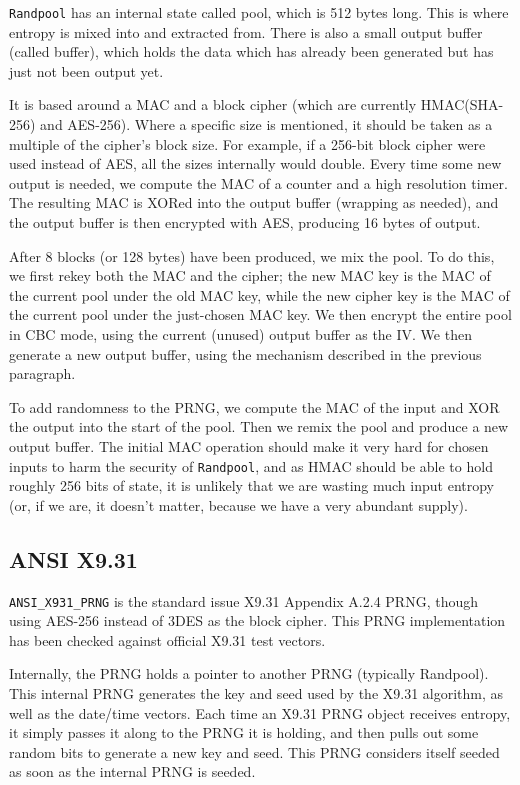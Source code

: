 \documentclass{article}
\newcommand{\type}[1]{\texttt{#1}}
\begin{document}
\type{Randpool} has an internal state called pool, which is 512 bytes
long. This is where entropy is mixed into and extracted from. There is also a
small output buffer (called buffer), which holds the data which has already
been generated but has just not been output yet.

It is based around a MAC and a block cipher (which are currently HMAC(SHA-256)
and AES-256). Where a specific size is mentioned, it should be taken as a
multiple of the cipher's block size. For example, if a 256-bit block cipher
were used instead of AES, all the sizes internally would double. Every time
some new output is needed, we compute the MAC of a counter and a high
resolution timer. The resulting MAC is XORed into the output buffer (wrapping
as needed), and the output buffer is then encrypted with AES, producing 16
bytes of output.

After 8 blocks (or 128 bytes) have been produced, we mix the pool. To do this,
we first rekey both the MAC and the cipher; the new MAC key is the MAC of the
current pool under the old MAC key, while the new cipher key is the MAC of the
current pool under the just-chosen MAC key. We then encrypt the entire pool in
CBC mode, using the current (unused) output buffer as the IV. We then generate
a new output buffer, using the mechanism described in the previous paragraph.

To add randomness to the PRNG, we compute the MAC of the input and XOR the
output into the start of the pool. Then we remix the pool and produce a new
output buffer. The initial MAC operation should make it very hard for chosen
inputs to harm the security of \type{Randpool}, and as HMAC should be able to
hold roughly 256 bits of state, it is unlikely that we are wasting much input
entropy (or, if we are, it doesn't matter, because we have a very abundant
supply).

\subsection{ANSI X9.31}

\type{ANSI\_X931\_PRNG} is the standard issue X9.31 Appendix A.2.4 PRNG, though
using AES-256 instead of 3DES as the block cipher. This PRNG implementation has
been checked against official X9.31 test vectors.

Internally, the PRNG holds a pointer to another PRNG (typically
Randpool). This internal PRNG generates the key and seed used by the
X9.31 algorithm, as well as the date/time vectors. Each time an X9.31
PRNG object receives entropy, it simply passes it along to the PRNG it
is holding, and then pulls out some random bits to generate a new key
and seed. This PRNG considers itself seeded as soon as the internal
PRNG is seeded.
\end{document}
